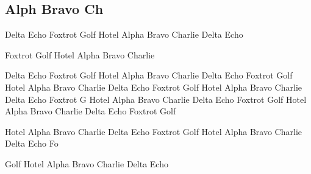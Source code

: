 \documentclass[11pt,a4paper]{article}
\begin{document}
\subsection{Alph	Bravo Ch}

Delta Echo Foxtrot Golf Hotel Alpha Bravo Charlie Delta Echo

Foxtrot Golf Hotel Alpha Bravo Charlie

Delta Echo Foxtrot Golf Hotel Alpha Bravo Charlie Delta Echo Foxtrot Golf Hotel Alpha Bravo Charlie Delta Echo Foxtrot Golf Hotel Alpha Bravo Charlie Delta Echo Foxtrot G
Hotel Alpha Bravo Charlie Delta Echo Foxtrot Golf Hotel Alpha Bravo Charlie Delta Echo Foxtrot Golf

Hotel Alpha Bravo Charlie Delta Echo Foxtrot Golf Hotel Alpha Bravo Charlie Delta Echo Fo

Golf Hotel Alpha Bravo Charlie Delta Echo
\end{document}
